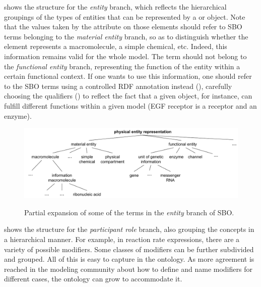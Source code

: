  shows the structure for the
\emph{ entity } branch, which reflects the hierarchical groupings of
the types of entities that can be represented by a \Compartment or
\Species object.  Note that the values taken by the
 attribute on those elements should refer to SBO
terms belonging to the \emph{material entity} branch, so as to
distinguish whether the element represents a macromolecule, a
simple chemical, etc.  Indeed, this information remains valid for
the whole model. The term should not belong to the
\emph{functional entity} branch, representing the function of the
entity within a certain functional context. If one wants to use
this information, one should refer to the SBO terms using a
controlled RDF annotation instead
(), carefully choosing the
qualifiers () to reflect
the fact that a given \Species object, for instance, can fulfill
different functions within a given model (\eg EGF receptor is a
receptor and an enzyme).

\begin{figure}[htb]
  \centering
  \vspace*{-1ex}
             {\includegraphics[scale=0.8]{figs/sbo-entity-l3v2}}
  \caption{Partial expansion of some of the terms in the
    \emph{entity} branch of SBO.}
  \label{fig:expanded-species}
\end{figure}

 shows the structure for the
\emph{participant role} branch, also grouping the concepts in a
hierarchical manner.  For example, in reaction rate expressions,
there are a variety of possible modifiers.  Some classes of
modifiers can be further subdivided and grouped.  All of this is
easy to capture in the ontology.  As more agreement is reached in
the modeling community about how to define and name modifiers for
different cases, the ontology can grow to accommodate it.

